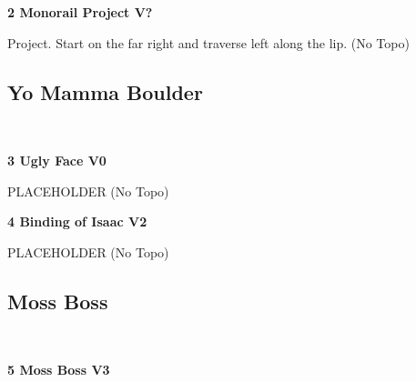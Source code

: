 \begin{multicols}{2}
					\begin{minipage}{\linewidth}	
					\label{rt:Monorail Project}
\colorbox{black!20}{
\parbox{0.95\textwidth}{
\textbf{
2 Monorail Project V?  
}
}
}

					\begin{adjustwidth}{0.5cm}{}				
					Project. Start on the far right and traverse left along the lip.
						\newline (No Topo) 
					\end{adjustwidth}
					\end{minipage}
			\subsection*{Yo Mamma Boulder}\label{bf:Yo Mamma Boulder}
			\begin{minipage}{\columnwidth}
			\
			\end{minipage}
			
					\begin{minipage}{\linewidth}	
					\label{rt:Ugly Face}
\colorbox{green!20}{
\parbox{0.95\textwidth}{
\textbf{
3 Ugly Face V0 \ding{72}  \warn 
}
}
}

					\begin{adjustwidth}{0.5cm}{}				
					PLACEHOLDER
						\newline (No Topo) 
					\end{adjustwidth}
					\end{minipage}
					\begin{minipage}{\linewidth}	
					\label{rt:Binding of Isaac}
\colorbox{green!20}{
\parbox{0.95\textwidth}{
\textbf{
4 Binding of Isaac V2  \ding{72}  \warn 
}
}
}

					\begin{adjustwidth}{0.5cm}{}				
					PLACEHOLDER
						\newline (No Topo) 
					\end{adjustwidth}
					\end{minipage}
			\subsection*{Moss Boss}\label{bf:Moss Boss}
			\begin{minipage}{\columnwidth}
			\
			\end{minipage}
			
					\begin{minipage}{\linewidth}	
					\label{rt:Moss Boss}
\colorbox{green!20}{
\parbox{0.95\textwidth}{
\textbf{
5 Moss Boss V3   
}
}
}


\end{minipage}
\end{multicols}

